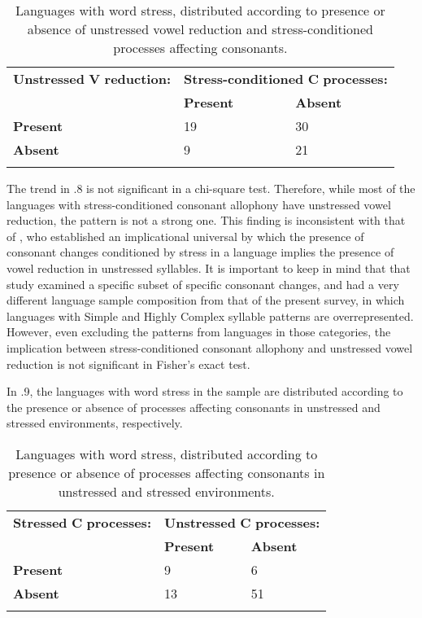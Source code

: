 \begin{table}
\begin{tabularx}{\textwidth}{XXX}
\lsptoprule
 \textbf{Unstressed} \textbf{V} \textbf{reduction:} & \multicolumn{2}{c}{ \textbf{Stress-conditioned} \textbf{C} \textbf{processes:}}\\
\hhline{-~~} & \textbf{Present} & \textbf{Absent}\\
 \textbf{Present} & 19 & 30\\
 \textbf{Absent} & 9 & 21\\
\lspbottomrule
\end{tabularx}
\caption{\label{5.8}Languages with word stress, distributed according to presence or absence of unstressed vowel reduction and stress-conditioned processes affecting consonants.}
\end{table}




  The trend in .8 is not significant in a chi-square test. Therefore, while most of the languages with stress-conditioned consonant allophony have unstressed vowel reduction, the pattern is not a strong one. This finding is inconsistent with that of \citet{BybeeEtAl1998}, who established an implicational universal by which the presence of consonant changes conditioned by stress in a language implies the presence of vowel reduction in unstressed syllables. It is important to keep in mind that that study examined a specific subset of specific consonant changes, and had a very different language sample composition from that of the present survey, in which languages with Simple and Highly Complex syllable patterns are overrepresented. However, even excluding the patterns from languages in those categories, the implication between stress-conditioned consonant allophony and unstressed vowel reduction is not significant in Fisher’s exact test.



   In .9, the languages with word stress in the sample are distributed according to the presence or absence of processes affecting consonants in unstressed and stressed environments, respectively.






\begin{table}
\begin{tabularx}{\textwidth}{XXX}
\lsptoprule
 \textbf{Stressed} \textbf{C} \textbf{processes:} & \multicolumn{2}{c}{ \textbf{Unstressed} \textbf{C} \textbf{processes:}}\\
\hhline{-~~} & \textbf{Present} & \textbf{Absent}\\
 \textbf{Present} & 9 & 6\\
 \textbf{Absent} & 13 & 51\\
\lspbottomrule
\end{tabularx}
\caption{\label{5.9}Languages with word stress, distributed according to presence or absence of processes affecting consonants in unstressed and stressed environments.}
\end{table}





